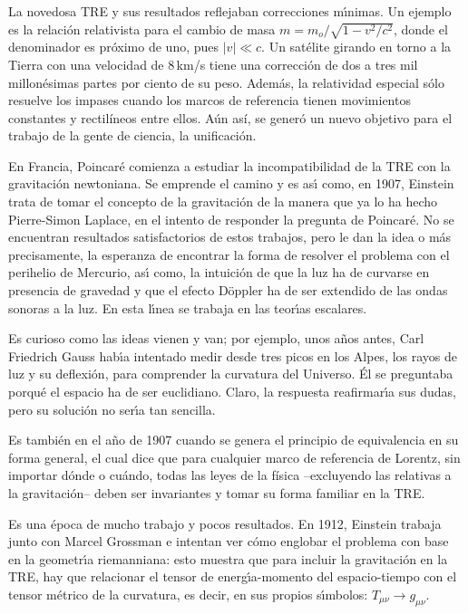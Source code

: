 \documentclass[12pt]{article}
\begin{document}
La novedosa TRE y sus resultados reflejaban correcciones m\'{\i}nimas. Un ejemplo es la relaci\'on relativista para el cambio de masa $m = {m_o}/{\sqrt{1 - v^2/c^2}}$, donde el denominador es próximo de uno, pues $|v| \ll c$. Un sat\'elite girando en torno a la Tierra con una velocidad de $8$\,km/s tiene una correcci\'on de dos a tres mil millon\'esimas partes por ciento de su peso. Además, la relatividad especial sólo resuelve los impases cuando los marcos de referencia tienen movimientos constantes y rectilíneos entre ellos. Aún así, se generó un nuevo objetivo para el trabajo de la gente de ciencia, la unificaci\'on. 

En Francia, Poincar\'e comienza a estudiar la incompatibilidad de la TRE con la gravitaci\'on newtoniana. Se emprende el camino y es as\'{\i} como, en 1907, Einstein trata de tomar el concepto de la gravitaci\'on de la manera que ya lo ha hecho Pierre-Simon Laplace, en el intento de responder la pregunta de Poincar\'e. No se encuentran resultados satisfactorios de estos trabajos, pero le dan la idea o m\'as precisamente, la esperanza de encontrar la forma de resolver el problema con el perihelio de Mercurio, as\'{\i} como, la intuici\'on de que la luz ha de curvarse en presencia de gravedad y que el efecto D\"oppler ha de ser extendido de las ondas sonoras a la luz. En esta l\'{\i}nea se trabaja en las teor\'{\i}as escalares.

Es curioso como las ideas vienen y van; por ejemplo, unos a\~nos antes, Carl Friedrich Gauss hab\'{\i}a intentado medir desde tres picos en los Alpes, los rayos de luz y su deflexión, para comprender la curvatura del Universo.  \'El se preguntaba porqu\'e el espacio ha de ser euclidiano. Claro, la respuesta reafirmar\'{\i}a sus dudas, pero su soluci\'on no ser\'{\i}a tan sencilla.

Es tambi\'en en el a\~no de 1907 cuando se genera el principio de equivalencia en su forma general, el cual dice que para cualquier marco de referencia de Lorentz, sin importar dónde o cuándo, todas las leyes de la física --excluyendo las relativas a la gravitación-- deben ser invariantes y tomar su forma familiar en la TRE.

Es una época de mucho trabajo y pocos resultados. En 1912, Einstein trabaja junto con Marcel Grossman e intentan ver c\'omo englobar el problema con base en la geometr\'{\i}a riemanniana: esto muestra que para incluir la gravitaci\'on en la TRE, hay que relacionar el tensor de energ\'{\i}a-momento del espacio-tiempo con el tensor m\'etrico de la curvatura, es decir, en sus propios s\'{\i}mbolos: $T_{\mu\nu}\to g_{\mu\nu}$. 
\end{document}
